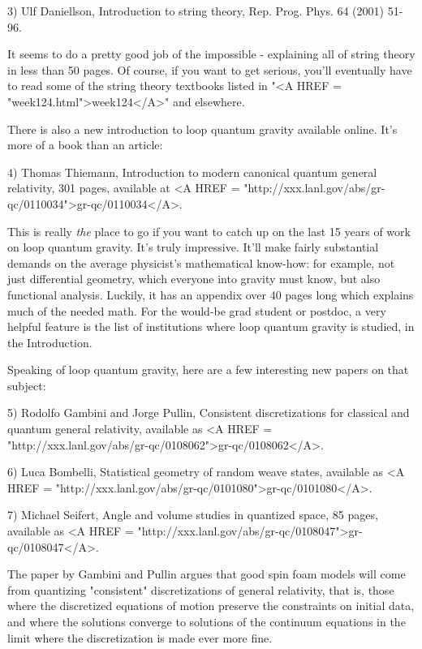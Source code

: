 3) Ulf Daniellson, Introduction to string theory, 
Rep. Prog. Phys. 64 (2001) 51-96.  

It seems to do a pretty good job of the impossible - explaining
all of string theory in less than 50 pages.  Of course, if you
want to get serious, you'll eventually have to read some of the
string theory textbooks listed in "<A HREF = "week124.html">week124</A>" and elsewhere.

There is also a new introduction to loop quantum gravity available
online.  It's more of a book than an article:

4) Thomas Thiemann, Introduction to modern canonical quantum general
relativity, 301 pages, available at <A HREF = "http://xxx.lanl.gov/abs/gr-qc/0110034">gr-qc/0110034</A>.

This is really \emph{the} place to go if you want to catch up on the last 15
years of work on loop quantum gravity.  It's truly impressive.  It'll
make fairly substantial demands on the average physicist's mathematical
know-how: for example, not just differential geometry, which everyone
into gravity must know, but also functional analysis.  Luckily, it has
an appendix over 40 pages long which explains much of the needed math.
For the would-be grad student or postdoc, a very helpful feature is the
list of institutions where loop quantum gravity is studied, in the
Introduction.

Speaking of loop quantum gravity, here are a few interesting
new papers on that subject:

5) Rodolfo Gambini and Jorge Pullin, Consistent discretizations for
classical and quantum general relativity, available as <A HREF = "http://xxx.lanl.gov/abs/gr-qc/0108062">gr-qc/0108062</A>.

6) Luca Bombelli, Statistical geometry of random weave states, available
as <A HREF = "http://xxx.lanl.gov/abs/gr-qc/0101080">gr-qc/0101080</A>.

7) Michael Seifert, Angle and volume studies in quantized space, 85 pages,
available as <A HREF = "http://xxx.lanl.gov/abs/gr-qc/0108047">gr-qc/0108047</A>.

The paper by Gambini and Pullin argues that good spin foam models will
come from quantizing "consistent" discretizations of general
relativity, that is, those where the discretized equations of motion
preserve the constraints on initial data, and where the solutions
converge to solutions of the continuum equations in the limit where the
discretization is made ever more fine.


